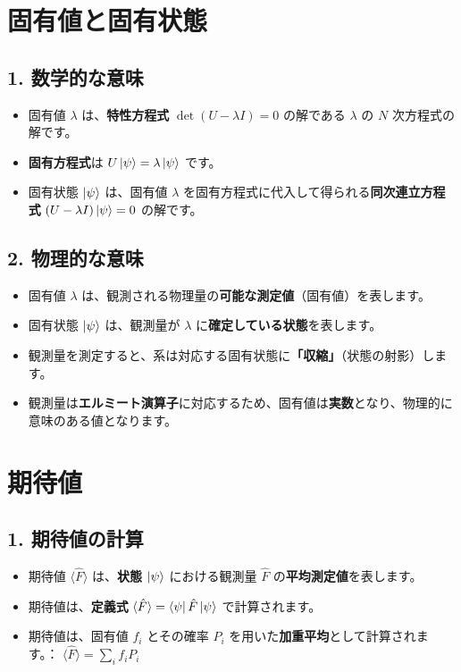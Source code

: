 \documentclass{ltjsarticle}
\begin{document}
\section*{固有値と固有状態}

\subsection*{1. 数学的な意味}
\begin{itemize}
    \item 固有値 $\lambda$ は、\textbf{特性方程式} $\det(U - \lambda I) = 0$ の解である $\lambda$ の $N$ 次方程式の解です。
    \item \textbf{固有方程式}は $U \ket{\psi} = \lambda \ket{\psi}$ です。
    \item 固有状態 $\ket{\psi}$ は、固有値 $\lambda$ を固有方程式に代入して得られる\textbf{同次連立方程式} $(U - \lambda I) \ket{\psi} = 0$ の解です。
\end{itemize}

\subsection*{2. 物理的な意味}
\begin{itemize}
    \item 固有値 $\lambda$ は、観測される物理量の\textbf{可能な測定値}（固有値）を表します。
    \item 固有状態 $\ket{\psi}$ は、観測量が $\lambda$ に\textbf{確定している状態}を表します。
    \item 観測量を測定すると、系は対応する固有状態に\textbf{「収縮」}（状態の射影）します。
    \item 観測量は\textbf{エルミート演算子}に対応するため、固有値は\textbf{実数}となり、物理的に意味のある値となります。
\end{itemize}


\section*{期待値}

\subsection*{1. 期待値の計算}
\begin{itemize}
    \item 期待値 $\langle \hat{F} \rangle$ は、\textbf{状態 $\ket{\psi}$ }における観測量 $\hat{F}$ の\textbf{平均測定値}を表します。
    \item 期待値は、\textbf{定義式} $\langle \hat{F} \rangle = \bra{\psi} \hat{F} \ket{\psi}$ で計算されます。
    \item 期待値は、固有値 $f_i$ とその確率 $P_i$ を用いた\textbf{加重平均}として計算されます。： $\langle \hat{F} \rangle = \sum_i f_i P_i$
\end{itemize}
\end{document}
